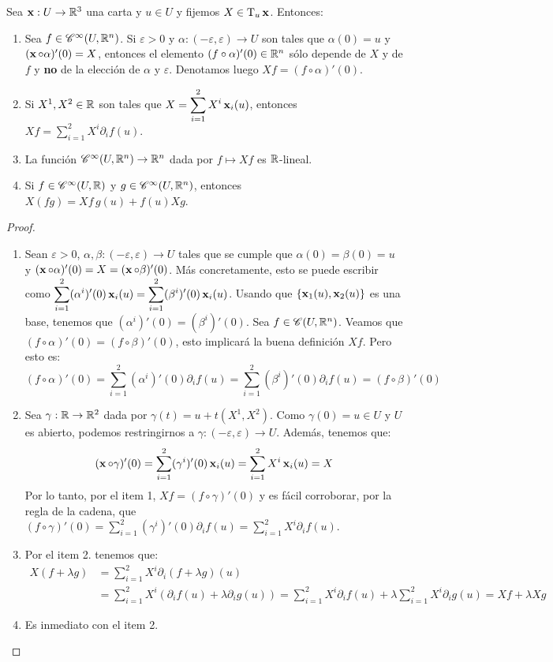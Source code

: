 \begin{prop}\label{prop::tangenteconcartas}
Sea $\operatorname{\mathbf{x}}:U\to\mathbb{R}^3$ una carta y $u\in U$ y fijemos $X\in\mathrm{T}_u\operatorname{\mathbf{x}}$. Entonces:
\begin{enumerate}
\item Sea $f\in\mathscr{C}^\infty(U,\mathbb{R}^n)$. Si $\varepsilon>0$ y $\alpha:(-\varepsilon,\varepsilon)\to U$ son tales que $\alpha(0)=u$ y $(\operatorname{\mathbf{x}}\circ\alpha)'(0)=X$, entonces el elemento $(f\circ\alpha)'(0)\in\mathbb{R}^n$ sólo depende de $X$ y de $f$ y \textbf{no} de la elección de $\alpha$ y $\varepsilon$. Denotamos luego $Xf=(f\circ\alpha)'(0)$.
\item Si $X^1,X^2\in\mathbb{R}$ son tales que $X=\displaystyle\sum_{i=1}^2 X^i\operatorname{\mathbf{x}}_i(u)$, entonces $Xf = \displaystyle\sum_{i=1}^2 X^i\partial_i f(u)$.
\item La función $\mathscr{C}^\infty(U,\mathbb{R}^n)\to\mathbb{R}^n$ dada por $f\mapsto Xf$ es $\mathbb{R}$-lineal.
\item Si $f\in\mathscr{C}^\infty(U,\mathbb{R})$ y $g\in\mathscr{C}^\infty(U,\mathbb{R}^n)$, entonces $X(fg)=Xf\, g(u) + f(u)Xg$.
\end{enumerate}
\begin{proof}
\hfill

\begin{enumerate}
\item Sean $\varepsilon>0$, $\alpha,\beta:(-\varepsilon,\varepsilon)\to U$ tales que se cumple que $\alpha(0)=\beta(0)=u$ y $(\operatorname{\mathbf{x}}\circ\alpha)'(0)=X=(\operatorname{\mathbf{x}}\circ\beta)'(0)$. Más concretamente, esto se puede escribir como $\displaystyle\sum_{i=1}^2 (\alpha^i)'(0)\operatorname{\mathbf{x}}_i(u) = \displaystyle\sum_{i=1}^2 (\beta^i)'(0)\operatorname{\mathbf{x}}_i(u)$. Usando que $\{\operatorname{\mathbf{x}}_1(u),\operatorname{\mathbf{x}}_2(u)\}$ es una base, tenemos que $(\alpha^i)'(0)=(\beta^i)'(0)$.
Sea $f\in\mathscr{C}(U,\mathbb{R}^n)$. Veamos que $(f\circ\alpha)'(0)=(f\circ\beta)'(0)$, esto implicará la buena definición $Xf$. Pero esto es: $$(f\circ\alpha)'(0)=\displaystyle\sum_{i=1}^2 (\alpha^i)'(0)\partial_i f(u) = \displaystyle\sum_{i=1}^2 (\beta^i)'(0)\partial_{i} f(u)=(f\circ\beta)'(0)$$
\item Sea $\gamma:\mathbb{R}\to\mathbb{R}^2$ dada por $\gamma(t)=u+t(X^1,X^2)$. Como $\gamma(0)=u\in U$ y $U$ es abierto, podemos restringirnos a $\gamma:(-\varepsilon,\varepsilon)\to U$. Además, tenemos que: $$(\operatorname{\mathbf{x}}\circ\gamma)'(0)=\displaystyle\sum_{i=1}^2 (\gamma^i)'(0)\operatorname{\mathbf{x}}_i(u) = \displaystyle\sum_{i=1}^2 X^i \operatorname{\mathbf{x}}_i(u)=X$$ Por lo tanto, por el item 1, $Xf=(f\circ\gamma)'(0)$ y es fácil corroborar, por la regla de la cadena, que $(f\circ\gamma)'(0)=\displaystyle\sum_{i=1}^2 (\gamma^i)'(0)\partial_i f(u)=\displaystyle\sum_{i=1}^2 X^i\partial_i f(u)$.
\item Por el item 2. tenemos que: \begin{align*}X(f+\lambda g)&=\displaystyle\sum_{i=1}^2 X^i \partial_i(f+\lambda g)(u)\\ &= \displaystyle\sum_{i=1}^2 X^i (\partial_i f(u)+ \lambda \partial_i g(u)) = \displaystyle\sum_{i=1}^2 X^i\partial_i f(u) + \lambda \displaystyle\sum_{i=1}^2 X^i\partial_i g(u) = Xf + \lambda Xg\end{align*}
\item Es inmediato con el item 2.\end{enumerate}\end{proof}
\end{prop}

